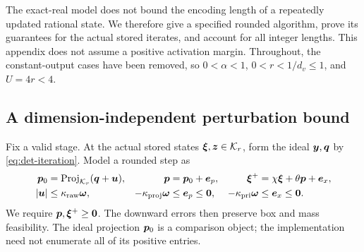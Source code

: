 The exact-real model does not bound the encoding length of a repeatedly
updated rational state. We therefore give a specified rounded algorithm,
prove its guarantees for the actual stored iterates, and account for all
integer lengths. This appendix does not assume a positive activation margin.
Throughout, the constant-output cases have been removed, so
$0<\alpha<1$, $0<r<1/d_v\leq1$, and $U=4r<4$.

\subsection{A dimension-independent perturbation bound}

Fix a valid stage. At the actual stored states $\bm{\xi},\bm{z}\in\mathcal{K}_r$,
form the ideal $\bm{y},\bm{q}$ by \cref{eq:det-iteration}. Model a rounded step as
\begin{equation*}
 \begin{aligned}
 \bm{p}_0&=\operatorname{Proj}_{\mathcal{K}_r}(\bm{q}+\bm{u}),&
 \bm{p}&=\bm{p}_0+\bm{e}_p,&
 \bm{\xi}^+&=\chi\bm{\xi}+\theta\bm{p}+\bm{e}_x,\\
 |\bm{u}|&\leq\kappa_{\mathrm{raw}}\bm{\omega},&
 -\kappa_{\mathrm{proj}}\bm{\omega}&\leq\bm{e}_p\leq\bm{0},&
 -\kappa_{\mathrm{pri}}\bm{\omega}&\leq\bm{e}_x\leq\bm{0}.
 \end{aligned}
\end{equation*}
We require $\bm{p},\bm{\xi}^+\geq\bm{0}$. The downward errors then preserve
box and mass feasibility. The ideal projection $\bm{p}_0$ is a comparison
object; the implementation need not enumerate all of its positive entries.

